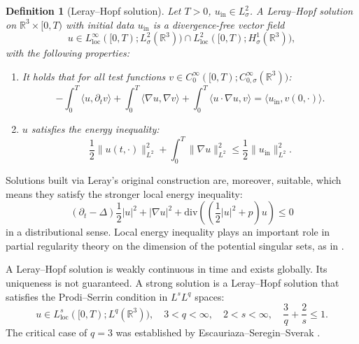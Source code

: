\documentclass[11pt,a4paper]{article}
\numberwithin{equation}{section}
\newcommand{\cdummy}{\cdot}
\newcommand{\tmop}[1]{\ensuremath{\operatorname{#1}}}
\newenvironment{enumeratenumeric}{\begin{enumerate}[1.] }{\end{enumerate}}
\newtheorem{definition}{Definition}
\begin{document}
\begin{definition}[Leray--Hopf
solution]{\cite{sohr2012navier}}
  Let $T > 0$, $u_{\tmop{in}} \in L_{\sigma}^2$. A Leray--Hopf solution on
  $\mathbb{R}^3 \times [0, T)$ with initial data $u_{\tmop{in}}$  is a divergence-free vector field
  \[ u \in L^{\infty}_{\tmop{loc}} ([0, T) ; L^2_{\sigma} (\mathbb{R}^3)) \cap
     L^2_{\tmop{loc}} ([0, T) ; H^{1}_{\sigma} (\mathbb{R}^3)) , \] with the following properties:
  \begin{enumeratenumeric}
    \item It holds that for all test functions $v \in C^{\infty}_0 ([0, T) ;
    C^{\infty}_{0, \sigma} (\mathbb{R}^3))$:
    \[ - \int_0^T \langle u, \partial_t v \rangle + \int_0^T \langle \nabla u,
       \nabla v \rangle + \int_0^T \langle u \cdot \nabla u, v \rangle =
       \langle u_{\tmop{in}}, v (0, \cdummy) \rangle . \]
    \item $u$ satisfies the energy inequality:
    \[ \frac{1}{2} \| u (t, \cdummy) \|^2_{L^2} + \int_0^T \| \nabla u \|^2_{L^2} \leqslant
       \frac{1}{2} \| u_{\tmop{in}} \|_{L^2}^2 . \]
  \end{enumeratenumeric}
\end{definition}
\begin{remark}[Suitability]
    Solutions built via Leray's original construction are, moreover, suitable, which means they satisfy the stronger local energy inequality:
    \begin{equation}
    (\partial_t-\Delta)\frac{1}{2}|u|^2+|\nabla u|^2+\mathrm{div}((\frac{1}{2}|u|^2+p)u)\leqslant 0
        \label{suitability}
    \end{equation}
    in a distributional sense. %
    Local energy inequality plays an important role in partial regularity theory on the dimension of the potential singular sets, as in \cite{caffarelli1982partial,lin1998new}.
\end{remark}
A Leray--Hopf solution is weakly continuous in time {\cite{sohr2012navier}} and exists globally. Its uniqueness is not guaranteed.
A strong solution is a Leray--Hopf solution that satisfies the Prodi--Serrin \cite{prodi1959teorema, serrin1963initial}
condition in $L^sL^q$ spaces:
\begin{equation}
  u \in L^s_{\tmop{loc}} ([0, T) ; L^q (\mathbb{R}^3)),\quad 3 < q < \infty,\quad 2 < s < \infty,\quad \frac{3}{q} + \frac{2}{s}
\leqslant 1. \label{eq:Serrin}
\end{equation}
The critical case of $q=3$ was established by Escauriaza--Seregin--Sverak  \cite{sverak2003}.
\end{document}
